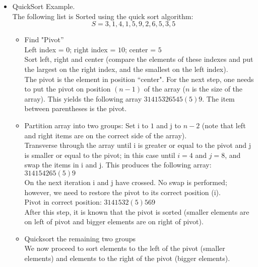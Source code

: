 \documentclass{article}
\begin{document}
\begin{itemize}
\item QuickSort Example.\\
The following list is Sorted using the quick sort algorithm:\\
$$S = 3, 1, 4, 1, 5, 9, 2, 6, 5, 3, 5$$

\begin{itemize}
\item Find "Pivot''\\
Left index = $0$; right index = $10$; center = $5$\\
Sort left, right and center (compare the elements of these indexes and
put the largest on the right index, and the smallest on the left
index).\\
The pivot is the element in position ``center". For the next step, one
needs to put the pivot on position $(n - 1)$ of the array ($n$ is the
size of the array). This yields the following array $3 1 4 1 5 3 2 6
5 4 5 (5) 9$. The item between parentheses is the pivot.\\
\item Partition array into two groups:
Set i to $1$ and j to $n - 2$ (note that left and  right items are on
the
correct side of the array).\\
Transverse through the array until i is greater or equal to the pivot
and j
is smaller or equal to the pivot; in this case until $i = 4$ and
$j = 8$, and swap the items in i and j. This produces the following
array:
$3 1 4 1 5 4 2 6 5 (5) 9$\\
On the next iteration i and j have crossed. No swap is performed;
however, we need to restore the pivot to its correct position (i).\\
Pivot in correct position: $3 1 4 1 5 3 2 (5) 5 6 9$\\
After this step, it is known that the pivot is sorted (smaller elements
are on left of pivot and bigger elements are on right of pivot).\\
\item Quicksort the remaining two groups \\
We now proceed to sort elements to the left of the pivot (smaller
elements) and elements to the right of the pivot (bigger
elements).\\
\end{itemize}


\end{itemize}
\end{document}
